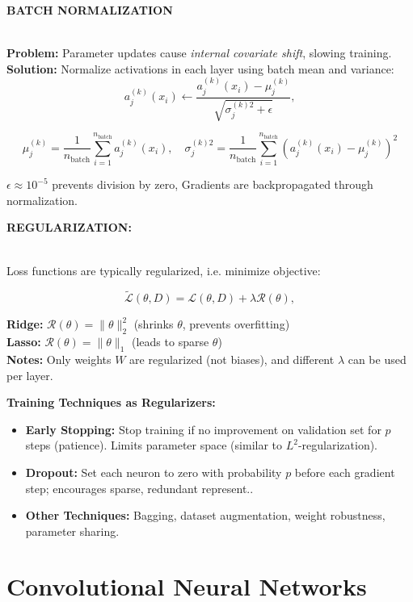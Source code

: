 \documentclass[a4paper,10pt]{article}
\newenvironment{myitemize}
{\vspace{-0.25cm}\begin{itemize}}
{\end{itemize}}
\newcommand{\subtitle}[1]{\vspace{0.25cm}\begin{normalsize}\textbf{\textcolor{gray!150}{\uppercase{#1}}}\end{normalsize}}
\begin{document}
\begin{small}
\subtitle{Batch Normalization} \\
\textbf{Problem:} Parameter updates cause \textit{internal covariate shift}, slowing training. \\
\textbf{Solution:} Normalize activations in each layer using batch mean and variance:
$$
a_j^{(k)}(x_i) \leftarrow \frac{a_j^{(k)}(x_i) - \mu_j^{(k)}}{\sqrt{\sigma_j^{(k)2} + \epsilon}},
$$
\begin{footnotesize}
$$
\mu_j^{(k)} = \frac{1}{n_{\text{batch}}} \sum_{i=1}^{n_{\text{batch}}} a_j^{(k)}(x_i), \quad \sigma_j^{(k)2} = \frac{1}{n_{\text{batch}}} \sum_{i=1}^{n_{\text{batch}}} \left(a_j^{(k)}(x_i) - \mu_j^{(k)}\right)^2
$$
\end{footnotesize}
$\epsilon \approx 10^{-5}$ prevents division by zero, Gradients are backpropagated through normalization.

\subtitle{Regularization:} \\
Loss functions are typically regularized, i.e. minimize objective: 

$$
\tilde{\mathcal{L}}(\theta, D) = \mathcal{L}(\theta, D) + \lambda \mathcal{R}(\theta),
$$

\textbf{Ridge:} $\mathcal{R}(\theta) = \|\theta\|_2^2$ (shrinks $\theta$, prevents overfitting) \\
\textbf{Lasso:} $\mathcal{R}(\theta) = \|\theta\|_1$ (leads to sparse $\theta$) \\
\textbf{Notes:} Only weights $W$ are regularized (not biases), and different $\lambda$ can be used per layer.

\textbf{Training Techniques as Regularizers:}

\begin{myitemize}
    \item \textbf{Early Stopping:} Stop training if no improvement on validation set for $p$ steps (patience). Limits parameter space (similar to $L^2$-regularization).
    \item \textbf{Dropout:} Set each neuron to zero with probability $p$ before each gradient step; encourages sparse, redundant represent..
    \item \textbf{Other Techniques:} Bagging, dataset augmentation, weight robustness, parameter sharing.
\end{myitemize}

\newpage

\section{Convolutional Neural Networks}


\end{small}
\end{document}
